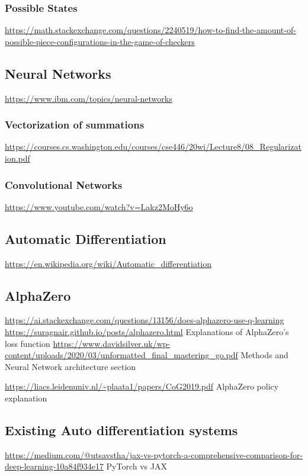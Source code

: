 \documentclass{article}
\begin{document}
    \subsubsection{Possible States}
    \noindent \url{https://math.stackexchange.com/questions/2240519/how-to-find-the-amount-of-possible-piece-configurations-in-the-game-of-checkers}
    
    \subsection{Neural Networks}
    \noindent \url{https://www.ibm.com/topics/neural-networks}

    \subsubsection{Vectorization of summations}
    \noindent \url{https://courses.cs.washington.edu/courses/cse446/20wi/Lecture8/08_Regularization.pdf}

    \subsubsection{Convolutional Networks}
    \noindent \url{https://www.youtube.com/watch?v=Lakz2MoHy6o}\\

    \subsection{Automatic Differentiation}
    \noindent \url{https://en.wikipedia.org/wiki/Automatic_differentiation}

    \subsection{AlphaZero}
    \noindent \url{https://ai.stackexchange.com/questions/13156/does-alphazero-use-q-learning}
    \noindent \url{https://suragnair.github.io/posts/alphazero.html}
    Explanations of AlphaZero's loss function
    \noindent \url{https://www.davidsilver.uk/wp-content/uploads/2020/03/unformatted_final_mastering_go.pdf} Methods and Neural Network architecture section

    \noindent \url{https://liacs.leidenuniv.nl/~plaata1/papers/CoG2019.pdf}
    AlphaZero policy explanation

    \subsection{Existing Auto differentiation systems}
    \noindent \url{https://medium.com/@utsavstha/jax-vs-pytorch-a-comprehensive-comparison-for-deep-learning-10a84f934e17}
    PyTorch vs JAX
\end{document}
